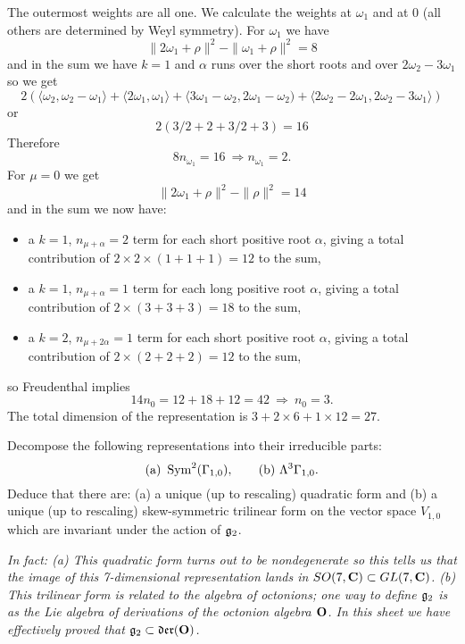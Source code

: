 \documentclass[12pt]{article}
\begin{document}
\begin{answer}
\begin{enumerate}[(a)]
The outermost weights are all one. We calculate the weights at $\omega_1$ and at $0$ (all others are determined by Weyl symmetry). For $\omega_1$ we have
\[\|2\omega_1+\rho\|^2-\|\omega_1+\rho\|^2=8\]
and in the sum we have $k=1$ and $\alpha$ runs over the short roots and over $2\omega_2-3\omega_1$ so we get
\[2\left(\langle\omega_2,\omega_2-\omega_1\rangle+\langle 2\omega_1,\omega_1\rangle+\langle 3\omega_1-\omega_2,2\omega_1-\omega_2)+\langle 2\omega_2-2\omega_1,2\omega_2-3\omega_1\rangle\right)\]
or
\[2(3/2+2+3/2+3)=16\]
Therefore
\[8n_{\omega_1}=16\ \Rightarrow n_{\omega_1}=2.\]
For $\mu=0$ we get
\[\|2\omega_1+\rho\|^2-\|\rho\|^2=14\]
and in the sum we now have:
\begin{itemize}
\item a $k=1$, $n_{\mu+\alpha}=2$ term for each short positive root $\alpha$, giving a total contribution of $2\times 2\times(1+1+1)=12$ to the sum,
\item a $k=1$, $n_{\mu+\alpha}=1$ term for each long positive root $\alpha$, giving a total contribution of $2\times(3+3+3)=18$ to the sum,
\item a $k=2$, $n_{\mu+2\alpha}=1$ term for each short positive root $\alpha$, giving a total contribution of $2\times(2+2+2)=12$ to the sum,
\end{itemize}
so Freudenthal implies
\[14n_0=12+18+12=42\ \Rightarrow\ n_0=3.\]
The total dimension of the representation is $3+2\times 6 +1\times 12=27$.
\end{enumerate}
\end{answer}
\newpage

\bigskip

\begin{question}\label{qun:g2decom}
Decompose the following representations into their irreducible parts:
\[\mbox{(a) }\operatorname{Sym}^2(\Gamma_{1,0}),\qquad\mbox{(b) }\Lambda^3\Gamma_{1,0}.\]
Deduce that there are: (a) a unique (up to rescaling) quadratic form and (b) a unique (up to rescaling) skew-symmetric trilinear form on the vector space $V_{1,0}$ which are invariant under the action of $\mathfrak{g}_2$.

{\em In fact: (a) This quadratic form turns out to be nondegenerate so this tells us that the image of this 7-dimensional representation lands in $SO(7,\mathbf{C})\subset GL(7,\mathbf{C})$. (b) This trilinear form is related to the algebra of octonions; one way to define $\mathfrak{g}_2$ is as the Lie algebra of derivations of the octonion algebra $\mathbf{O}$. In this sheet we have effectively proved that $\mathfrak{g}_2\subset\mathfrak{der}(\mathbf{O})$.}
\end{question}
\end{document}
